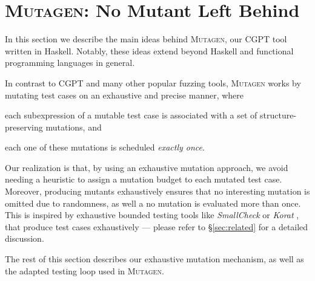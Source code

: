 \documentclass[sigconf, anonymous, review]{acmart}
\newcommand{\mutagen}{\textsc{Mutagen}\xspace}
\begin{document}
\section{\mutagen: No Mutant Left Behind}
\label{sec:mutagen}

In this section we describe the main ideas behind \mutagen, our CGPT tool
written in Haskell.
%
Notably, these ideas extend beyond Haskell and functional programming languages
in general.
%

In contrast to CGPT and many other popular fuzzing tools, \mutagen works by
mutating test cases on an exhaustive and precise manner, where
%
\begin{inparaenum}
  \item each subexpression of a mutable test case is associated with a set of
    structure-preserving mutations, and
  \item each one of these mutations is scheduled \emph{exactly once}.
\end{inparaenum}
%
%
Our realization is that, by using an exhaustive mutation approach, we avoid
needing a heuristic to assign a mutation budget to each mutated test case.
%
Moreover, producing mutants exhaustively ensures that no interesting mutation is
omitted due to randomness, as well a no mutation is evaluated more than once.
%
This is inspired by exhaustive bounded testing tools like \emph{SmallCheck}
\cite{runciman2008smallcheck} or \emph{Korat} \cite{boyapati2002korat}, that
produce test cases exhaustively --- please refer to \S \ref{sec:related}
for a detailed discussion.


The rest of this section describes our exhaustive mutation mechanism, as well as
the adapted testing loop used in \mutagen.

\end{document}
